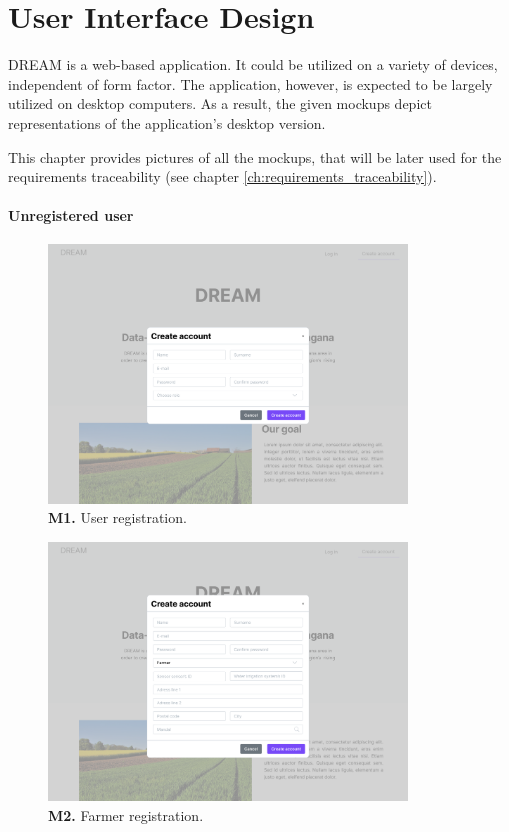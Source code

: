 \chapter{User Interface Design}

DREAM is a web-based application. It could be utilized on a variety of devices, independent of form factor. The application, however, is expected to be largely utilized on desktop computers. As a result, the given mockups depict representations of the application's desktop version.

This chapter provides pictures of all the  mockups, that will be later used for the requirements traceability (see chapter \ref{ch:requirements_traceability}).

\subsubsection{Unregistered user}

\begin{figure}[H]
\centering
\includegraphics[width=0.85\textwidth]{mockups/Unreg. user_Create account.png}
\caption{\textbf{M1.} User registration.}
\end{figure}

\begin{figure}[H]
    \centering
    \includegraphics[width=0.85\textwidth]{mockups/Unreg. user_Create account_Farmer.png}
    \caption{\textbf{M2.} Farmer registration.}
\end{figure}

